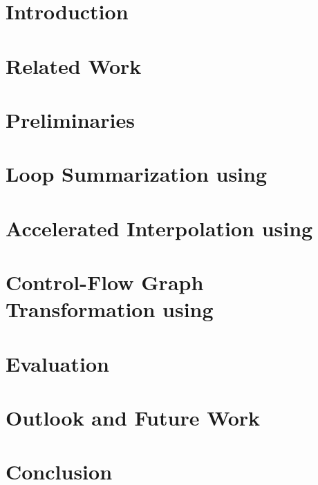 \documentclass[11pt]{article}
\begin{document}
\newcommand{\HorizontalLine}{\rule{\linewidth}{0.3mm}}


\pagebreak


\pagebreak



\tableofcontents
\pagebreak

\section{Introduction}
\label{intro}


\section{Related Work}
\label{relWork}

\pagebreak

\section{Preliminaries}
\label{background}


\section{Loop Summarization using \qvasr}
\label{qvasr}


\begin{comment}
	\section{Extension to \qvasrs}
	\label{qvasrs}
	
\end{comment}

\section{Accelerated Interpolation using \qvasr}
\label{accelInterpol}


\section{Control-Flow Graph Transformation using \qvasr}
\label{impl}


\section{Evaluation}
\label{eval}


\section{Outlook and Future Work}
\label{futrWork}


\section{Conclusion}
\label{concl}



\pagebreak


\end{document}

